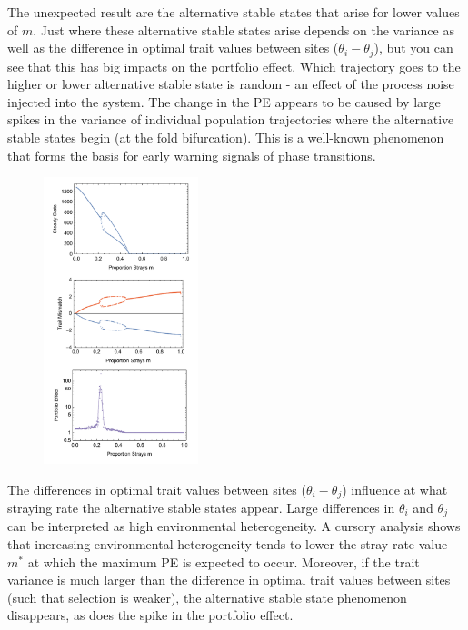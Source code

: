 \documentclass[onecolumn,preprintnumbers,amsmath,amssymb,superscriptaddress]{revtex4}
\begin{document}
The unexpected result are the alternative stable states that arise for lower values of $m$. Just where these alternative stable states arise depends on the variance as well as the difference in optimal trait values between sites ($\theta_i-\theta_j$), but you can see that this has big impacts on the portfolio effect.
Which trajectory goes to the higher or lower alternative stable state is random - an effect of the process noise injected into the system.
The change in the PE appears to be caused by large spikes in the variance of individual population trajectories where the alternative stable states begin (at the fold bifurcation).
This is a well-known phenomenon that forms the basis for early warning signals of phase transitions.

\begin{figure}[h]
\centering
\includegraphics[width=0.4\textwidth]{figs/fig_Density.pdf}
\caption{} \label{fig:traj}
\end{figure}


The differences in optimal trait values between sites ($\theta_i-\theta_j$) influence at what straying rate the alternative stable states appear.
Large differences in $\theta_i$ and $\theta_j$ can be interpreted as high environmental heterogeneity.
A cursory analysis shows that increasing environmental heterogeneity tends to lower the stray rate value $m^*$ at which the maximum PE is expected to occur.
Moreover, if the trait variance is much larger than the difference in optimal trait values between sites (such that selection is weaker), the alternative stable state phenomenon disappears, as does the spike in the portfolio effect.
\end{document}

